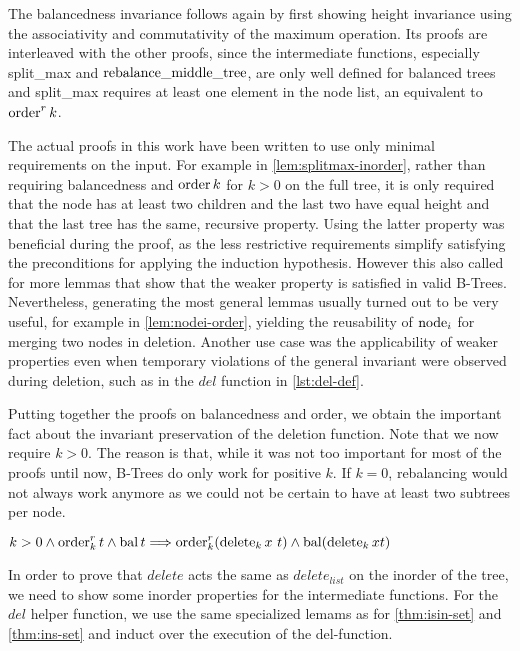 The balancedness invariance follows again by first showing height invariance
using the associativity and commutativity of the maximum operation.
Its proofs are interleaved with the other proofs,
since the intermediate functions, especially
split\_max and $\operatorname{rebalance\_middle\_tree}$, are only well defined for balanced trees
and split\_max requires at least one element in the node list, an equivalent
to $\operatorname{order}^r k$.

The actual proofs in this work have been written to use only
minimal requirements on the input.
For example in \autoref{lem:splitmax-inorder}, rather than
requiring balancedness and $\operatorname{order} k$ for $k > 0$ on the full tree,
it is only required that the node has at least two children
and the last two have equal height and that the last tree has the same, recursive property.
Using the latter property was beneficial during the proof,
as the less restrictive requirements simplify satisfying
the preconditions for applying the induction hypothesis.
However this also called for more lemmas that show that
the weaker property is satisfied in valid B-Trees.
Nevertheless, generating the most general lemmas usually turned out to be
very useful, for example in \autoref{lem:nodei-order}, yielding the reusability of $\operatorname{node}_i$ for
merging two nodes in deletion.
Another use case was the applicability of weaker properties
even when temporary violations
of the general invariant were observed during deletion,
such as in the $del$ function in \autoref{lst:del-def}.

Putting together the proofs on balancedness and
order, we obtain the important fact about the invariant preservation of the deletion function.
Note that we now require $k > 0$.
The reason is that, while it was not too important for most of the proofs until now,
B-Trees do only work for positive $k$.
If $k = 0$, rebalancing would not always work anymore
as we could not be certain to have at least two subtrees per node.

\begin{theorem}
    $k > 0 \wedge \operatorname{order}^r_k t \wedge \operatorname{bal} t \Longrightarrow
    \operatorname{order}^r_k (\operatorname{delete}_k x\ t) \wedge \operatorname{bal} (\operatorname{delete}_k x t)$
\end{theorem}

In order to prove that $delete$ acts the same as
$delete_{list}$ on the inorder of the tree,
we need to show some inorder properties for the intermediate functions.
For the $del$ helper function, 
we use the same specialized lemams
as for \autoref{thm:isin-set} and \autoref{thm:ins-set}
and induct over the execution of the del-function.

